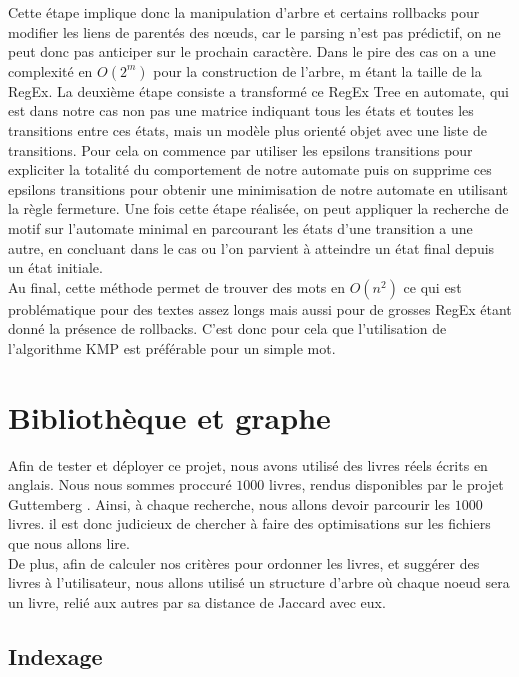 \documentclass{article}
\begin{document}
Cette étape implique donc la manipulation d’arbre et certains rollbacks pour modifier les liens de parentés des nœuds, car le parsing n’est pas prédictif, on ne peut donc pas anticiper sur le prochain caractère. Dans le pire des cas on a une complexité en $O(2^m)$ pour la construction de l’arbre, m étant la taille de la RegEx. La deuxième étape consiste a transformé ce RegEx Tree en automate, qui est dans notre cas non pas une matrice indiquant tous les états et toutes les transitions entre ces états, mais un modèle plus orienté objet avec une liste de transitions. Pour cela on commence par utiliser les epsilons transitions pour expliciter la totalité du comportement de notre automate puis on supprime ces epsilons transitions pour obtenir une minimisation de notre automate en utilisant la règle fermeture. Une fois cette étape réalisée, on peut appliquer la recherche de motif sur l’automate minimal en parcourant les états d’une transition a une autre, en concluant dans le cas ou l’on parvient à atteindre un état final depuis un état initiale.\\

Au final, cette méthode permet de trouver des mots en $O(n^2)$ ce qui est problématique pour des textes assez longs mais aussi pour de grosses RegEx étant donné la présence de rollbacks. C'est donc pour cela que l'utilisation de l'algorithme KMP est préférable pour un simple mot.

\section{Bibliothèque et graphe}

Afin de tester et déployer ce projet, nous avons utilisé des livres réels écrits en anglais. Nous nous sommes proccuré $1000$ livres, rendus disponibles par le projet Guttemberg \cite{Guttemberg}. Ainsi, à chaque recherche, nous allons devoir parcourir les $1000$ livres. il est donc judicieux de chercher à faire des optimisations sur les fichiers que nous allons lire.\\

De plus, afin de calculer nos critères pour ordonner les livres, et suggérer des livres à l'utilisateur, nous allons utilisé un structure d'arbre où chaque noeud sera un livre, relié aux autres par sa distance de Jaccard avec eux.

\subsection{Indexage}
\end{document}
